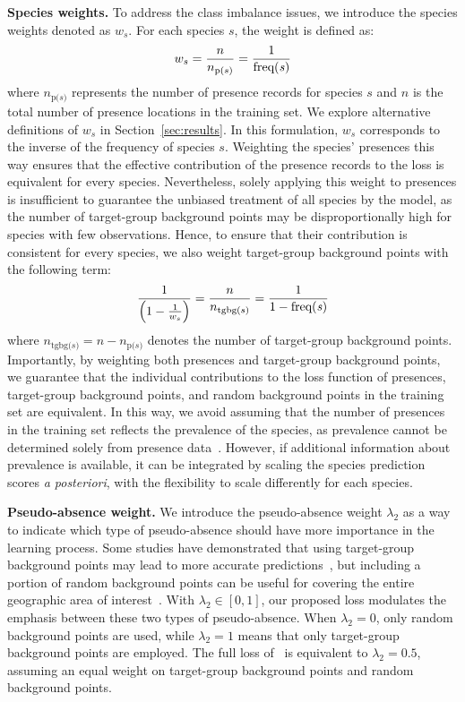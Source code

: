 \documentclass[3p,preprint,12pt]{elsarticle}
\begin{document}
\textbf{Species weights.}
To address the class imbalance issues, we introduce the species weights denoted as $w_s$. For each species $s$, the weight is defined as:
\begin{align}
        w_s = \frac{n}{n_{\text{p($s$)}}} = \frac{1}{\text{freq(\textit{s})}}
\end{align}
where $n_{\text{p($s$)}}$ represents the number of presence records for species $s$ and $n$ is the total number of presence locations in the training set. We explore alternative definitions of $w_s$ in Section~\ref{sec:results}. In this formulation, $w_s$ corresponds to the inverse of the frequency of species $s$. Weighting the species' presences this way ensures that the effective contribution of the presence records to the loss is equivalent for every species. Nevertheless, solely applying this weight to presences is insufficient to guarantee the unbiased treatment of all species by the model, as the number of target-group background points may be disproportionally high for species with few observations. Hence, to ensure that their contribution is consistent for every species, we also weight target-group background points with the following term:
\begin{align}
    \frac{1}{\left(1 - \frac{1}{w_s}\right)} = \frac{n}{n_{\text{tgbg($s$)}}} = \frac{1}{1 - \text{freq(\textit{s})}}
\end{align}
where $n_{\text{tgbg($s$)}} = n - n_{\text{p($s$)}}$ denotes the number of target-group background points.
Importantly, by weighting both presences and target-group background points, we guarantee that the individual contributions to the loss function of presences, target-group background points, and random background points in the training set are equivalent. In this way, we avoid assuming that the number of presences in the training set reflects the prevalence of the species, as prevalence cannot be determined solely from presence data~\citep{hastie2013inference}. However, if additional information about prevalence is available, it can be integrated by scaling the species prediction scores \textit{a posteriori}, with the flexibility to scale differently for each species.

\textbf{Pseudo-absence weight.}
We introduce the pseudo-absence weight $\lambda_2$ as a way to indicate which type of pseudo-absence should have more importance in the learning process. Some studies have demonstrated that using target-group background points may lead to more accurate predictions~\citep{phillips2009sample, botella2020bias}, but including a portion of random background points can be useful for covering the entire geographic area of interest~\citep{vanderwal2009selecting, cole2023spatial}. With $\lambda_2 \in [0,1]$, our proposed loss modulates the emphasis between these two types of pseudo-absence. When $\lambda_2 = 0$, only random background points are used, while $\lambda_2 = 1$ means that only target-group background points are employed. The full loss of~\cite{cole2023spatial} is equivalent to $\lambda_2 = 0.5$, assuming an equal weight on target-group background points and random background points.
\end{document}
